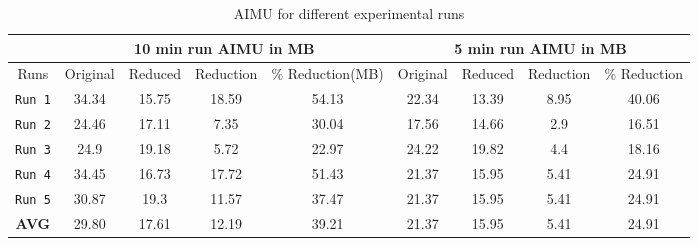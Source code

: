 \begin{table*}
\begin{center}
\begin{tabular}{|c||c|c|c|c|c|c|c|c|}
\hline
\hline
& \multicolumn{4}{|c|}{10 min run AIMU in MB} & \multicolumn{4}{|c|}{5 min run AIMU in MB} \\
\hline
Runs & Original & Reduced & Reduction & \% Reduction(MB) &  Original & Reduced & Reduction & \% Reduction \\
\hline
\hline
{\tt Run 1} & 34.34 & 15.75 & 18.59 & 54.13 & 22.34 & 13.39 & 8.95 & 40.06 \\
\hline
{\tt Run 2} & 24.46 & 17.11 & 7.35 & 30.04 & 17.56 & 14.66 & 2.9 & 16.51 \\
\hline
{\tt Run 3} & 24.9 & 19.18 & 5.72 & 22.97 & 24.22 & 19.82 & 4.4 & 18.16  \\
\hline
{\tt Run 4} & 34.45 & 16.73 & 17.72 & 51.43 & 21.37 & 15.95 & 5.41 & 24.91 \\
\hline
{\tt Run 5} & 30.87 & 19.3 & 11.57 & 37.47 & 21.37 & 15.95 & 5.41 & 24.91 \\
\hline
\hline
\hline
{\bf AVG} & 29.80 & 17.61 & 12.19 & 39.21 & 21.37 & 15.95 & 5.41 & 24.91 \\
\hline
\hline
\end{tabular}
\end{center}
\caption{AIMU for different experimental runs}
\label{tab:aimuforruns}
\end{table*}






